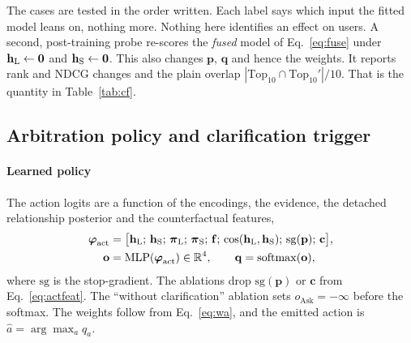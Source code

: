 The cases are tested in the order written. Each label says which input the fitted model leans on, nothing more. Nothing here identifies an effect on users. A second, post-training probe re-scores the \emph{fused} model of Eq.~\eqref{eq:fuse} under $\mathbf{h}_{\mathrm{L}}\leftarrow\mathbf{0}$ and $\mathbf{h}_{\mathrm{S}}\leftarrow\mathbf{0}$. This also changes $\mathbf{p}$, $\mathbf{q}$ and hence the weights. It reports rank and NDCG changes and the plain overlap $|\mathrm{Top}_{10}\cap\mathrm{Top}_{10}'|/10$. That is the quantity in Table~\ref{tab:cf}.

\subsection{Arbitration policy and clarification trigger}
\label{sec:policy}
\paragraph{Learned policy}
The action logits are a function of the encodings, the evidence, the detached relationship posterior and the counterfactual features,
\begin{align}
  \boldsymbol{\varphi}_{\mathrm{act}} &= \big[\mathbf{h}_{\mathrm{L}};\,\mathbf{h}_{\mathrm{S}};\,\boldsymbol{\pi}_{\mathrm{L}};\,\boldsymbol{\pi}_{\mathrm{S}};\,\mathbf{f};\,\cos(\mathbf{h}_{\mathrm{L}},\mathbf{h}_{\mathrm{S}});\,\mathrm{sg}(\mathbf{p});\,\mathbf{c}\big], \label{eq:actfeat}\\
  \mathbf{o} &= \mathrm{MLP}(\boldsymbol{\varphi}_{\mathrm{act}})\in\mathbb{R}^{4},\qquad \mathbf{q}=\mathrm{softmax}(\mathbf{o}), \label{eq:actpost}
\end{align}
where $\mathrm{sg}$ is the stop-gradient. The ablations drop $\mathrm{sg}(\mathbf{p})$ or $\mathbf{c}$ from Eq.~\eqref{eq:actfeat}. The ``without clarification'' ablation sets $o_{\mathrm{Ask}}=-\infty$ before the softmax. The weights follow from Eq.~\eqref{eq:wa}, and the emitted action is $\hat{a}=\arg\max_a q_a$.

